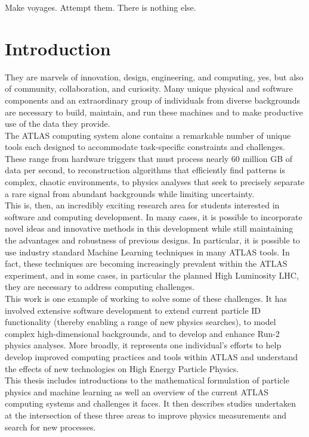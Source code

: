 \begin{savequote}[75mm]
Make voyages. Attempt them. There is nothing else.
\end{savequote}

\chapter{Introduction}
\label{introduction}

 They are marvels of innovation, design, engineering, and computing, yes, but also of community, collaboration, and curiosity. Many unique physical and software components and an extraordinary group of individuals from diverse backgrounds are necessary to build, maintain, and run these machines and to make productive use of the data they provide.\\

The ATLAS computing system alone contains a remarkable number of unique tools each designed to accommodate task-specific constraints and challenges. These range from hardware triggers that must process nearly 60 million GB of data per second, to reconstruction algorithms that efficiently find patterns is complex, chaotic environments, to physics analyses that seek to precisely separate a rare signal from abundant backgrounds while limiting uncertainty.\\

This is, then, an incredibly exciting research area for students interested in software and computing development. In many cases, it is possible to incorporate novel ideas and innovative methods in this development while still maintaining the advantages and robustness of previous designs. In particular, it is possible to use industry standard Machine Learning techniques in many ATLAS tools. In fact, these techniques are becoming increasingly prevalent within the ATLAS experiment, and in some cases, in particular the planned High Luminosity LHC, they are necessary to address computing challenges.\\

This work is one example of working to solve some of these challenges. It has involved extensive software development to extend current particle ID functionality (thereby enabling a range of new physics searches), to model complex high-dimensional backgrounds, and to develop and enhance Run-2 physics analyses. More broadly, it represents one individual's efforts to help develop improved computing practices and tools within ATLAS and understand the effects of new technologies on High Energy Particle Physics.\\

This thesis includes introductions to the mathematical formulation of particle physics and machine learning as well an overview of the current ATLAS computing systems and challenges it faces. It then describes studies undertaken at the intersection of these three areas to improve physics measurements and search for new processes. 
